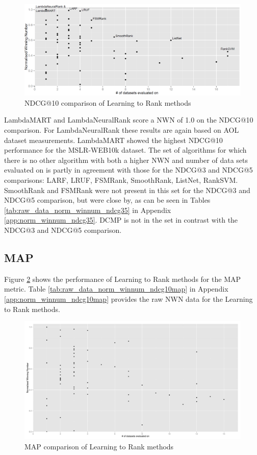 \begin{figure}[!h]
\centering
\includegraphics[scale=0.30]{gfx/ndcg10_winnum}
\caption{\acs{NDCG}@10 comparison of Learning to Rank methods}
\label{fig:normalised_winning_number_NDCG10}
\end{figure}

LambdaMART and LambdaNeuralRank score a \ac{NWN} of 1.0 on the \ac{NDCG}@10 comparison. For LambdaNeuralRank these results are again based on AOL dataset measurements. LambdaMART showed the highest \ac{NDCG}@10 performance for the MSLR-WEB10k dataset. The set of algorithms for which there is no other algorithm with both a higher \ac{NWN} and number of data sets evaluated on is partly in agreement with those for the \ac{NDCG}@3 and \ac{NDCG}@5 comparisons: {LARF, LRUF, FSMRank, SmoothRank, ListNet, RankSVM}. SmoothRank and FSMRank were not present in this set for the \ac{NDCG}@3 and \ac{NDCG}@5 comparison, but were close by, as can be seen in Tables \ref{tab:raw_data_norm_winnum_ndcg35} in Appendix \ref{app:norm_winnum_ndcg35}. DCMP is not in the set in contrast with the \ac{NDCG}@3 and \ac{NDCG}@5 comparison.

\subsection{MAP}
Figure \ref{fig:normalised_winning_number_map} shows the performance of Learning to Rank methods for the \ac{MAP} metric. Table \ref{tab:raw_data_norm_winnum_ndcg10map} in Appendix \ref{app:norm_winnum_ndcg10map} provides the raw \ac{NWN} data for the Learning to Rank methods.\\

\begin{figure}[!h]
\centering
\includegraphics[scale=0.30]{gfx/map_winnum}
\caption{\acs{MAP} comparison of Learning to Rank methods}
\label{fig:normalised_winning_number_map}
\end{figure}

